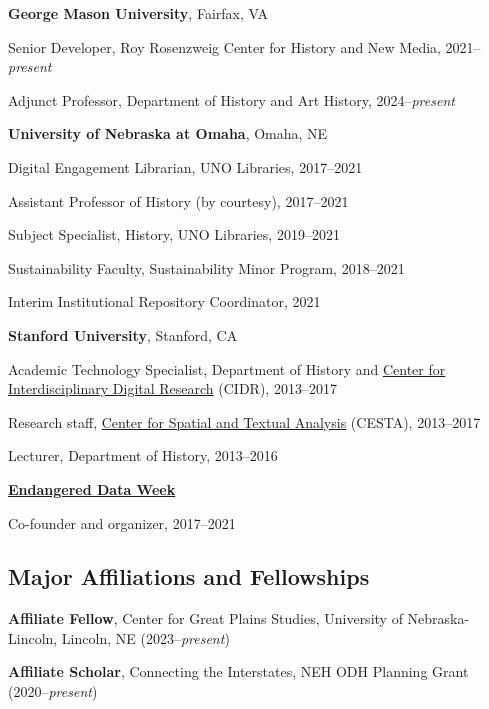 \documentclass[10pt]{article}
\begin{document}
\textbf{George Mason University}, Fairfax, VA

\quad Senior Developer, Roy Rosenzweig Center for History and New Media, 2021--\textit{present}

\quad Adjunct Professor, Department of History and Art History, 2024--\textit{present}

\vspace{.4cm}

\textbf{University of Nebraska at Omaha}, Omaha, NE

\quad Digital Engagement Librarian, UNO Libraries, 2017--2021

\quad Assistant Professor of History (by courtesy), 2017--2021

\quad Subject Specialist, History, UNO Libraries, 2019--2021

\quad Sustainability Faculty, Sustainability Minor Program, 2018--2021

\quad Interim Institutional Repository Coordinator, 2021

\vspace{.4cm}

\textbf{Stanford University}, Stanford, CA

\quad Academic Technology Specialist, Department of History and \href{http://cidr.stanford.edu}{Center for Interdisciplinary Digital Research} (CIDR), 2013--2017

\quad Research staff, \href{http://cesta.stanford.edu}{Center for Spatial and Textual Analysis} (CESTA), 2013--2017

\quad Lecturer, Department of History, 2013--2016

\vspace{.4cm}

\textbf{\href{https://endangereddataweek.org}{Endangered Data Week}}

\quad Co-founder and organizer, 2017--2021

\vspace{0.2cm}

\subsection*{Major Affiliations and Fellowships}

\textbf{Affiliate Fellow}, Center for Great Plains Studies, University of Nebraska-Lincoln, Lincoln, NE (2023--\textit{present})

\textbf{Affiliate Scholar}, Connecting the Interstates, NEH ODH Planning Grant (2020--\textit{present})
\end{document}
